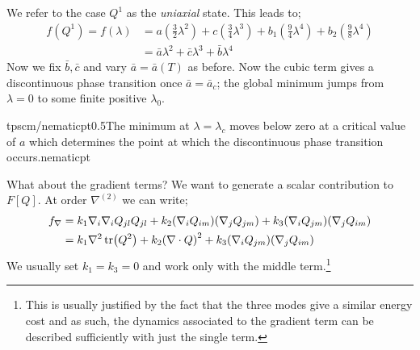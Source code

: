 We refer to the case $Q^1$ as the \emph{uniaxial} state. This leads to;
\begin{align*}
f(Q^1) = f(\lambda) &= a(\tfrac{3}{2}\lambda^2) + c(\tfrac{3}{4}\lambda^3) + b_1(\tfrac{9}{4}\lambda^4) + b_2(\tfrac{9}{8}\lambda^4) \\
&= \bar{a}\lambda^2 + \bar{c}\lambda^3 + \bar{b} \lambda^4
\end{align*}
Now we fix $\bar{b}, \bar{c}$ and vary $\bar{a} = \bar{a}(T)$ as before. Now the cubic term gives a discontinuous phase transition once $\bar{a} = \bar{a}_c$; the global minimum jumps from $\lambda = 0$ to some finite positive $\lambda_0$.
\begin{mygraphic}{tpscm/nematicpt}{0.5}{The minimum at $\lambda = \lambda_c$ moves below zero at a critical value of $a$ which determines the point at which the discontinuous phase transition occurs.}{nematicpt}\end{mygraphic}
What about the gradient terms? We want to generate a scalar contribution to $F[Q]$. At order $\nabla^{(2)}$ we can write;
\begin{align*}
f_{\nabla} &= k_1 \nabla_i \nabla_i Q_{jl}Q_{jl} + k_2 \left(\nabla_i Q_{im}\right) \left(\nabla_j Q_{jm}\right) + k_3 \left(\nabla_i Q_{jm}\right)\left(\nabla_j Q_{im}\right) \\
&= k_1\nabla^2 \tr(Q^2) + k_2 \left(\nabla \cdot Q\right)^2 + k_3\left(\nabla_i Q_{jm}\right)\left(\nabla_j Q_{im}\right) 
\end{align*}
We usually set $k_1 = k_3 = 0$ and work only with the middle term.\footnote{This is usually justified by the fact that the three modes give a similar energy cost and as such, the dynamics associated to the gradient term can be described sufficiently with just the single term.}
